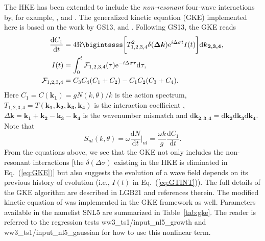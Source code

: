 The HKE has been extended to include the \emph{non-resonant} four-wave
interactions by, for example, \citet{Janssen2003}, \citet{Annenkov2006} and
\citet[][hereafter GS13]{Gramstad2013}. The generalized kinetic equation (GKE)
implemented here is based on the work by GS13, \citet{Gramstad2016} and
\citet[][hereafter LGB21]{Liu2021JFM}. Following GS13, the GKE reads
%
\begin{align}
\frac{\mathrm{d} C_1}{\mathrm{d} t} &= 4 \Re \bigintssss \bigg[ T^2_{1, 2, 3, 4} \delta (\boldsymbol{\Delta k}) \/\mathrm{e}^{i\Delta \sigma t} I(t) \/  \bigg] \mathrm{d} \boldsymbol{k_{2, 3, 4}}, \label{eq:GKE}\\
%
I(t) &= \int_{0}^{t} \mathcal{F}_{1, 2, 3, 4} (\tau) \mathrm{e}^{-i\Delta \sigma \tau } \mathrm{d} \tau, \label{eq:GTINT}\\
%
\mathcal{F}_{1, 2, 3, 4} &= C_3 C_4 (C_1 + C_2) - C_1 C_2 (C_3 + C_4). \label{eq:GPROD}
\end{align}
%
Here $C_1 = C(\boldsymbol{k_1}) = g N(k, \theta) / k$ is the action spectrum,
$T_{1, 2, 3, 4} = T(\boldsymbol{k_1}, \boldsymbol{k_2}, \boldsymbol{k_3}, \boldsymbol{k_4})$
is the interaction coefficient \citep{art:Kra94, art:Jan09},
$\Delta \boldsymbol{k} = \boldsymbol{k_1} + \boldsymbol{k_2} - \boldsymbol{k_3} - \boldsymbol{k_4}$
is the wavenumber mismatch and $\mathrm{d} \boldsymbol{k_{2,3,4}} = \mathrm{d} \boldsymbol{k_2} \mathrm{d} \boldsymbol{k_3} \mathrm{d} \boldsymbol{k_4}$.
Note that
\begin{equation}
S_{nl}(k, \theta) = \omega \frac{\mathrm{d} N}{\mathrm{d}t} \bigg\rvert_{nl} = \frac{\omega k}{g} \frac{\mathrm{d} C_1}{\mathrm{d} t}.
\label{eq:GSnl}
\end{equation}
From the equations above, we see that the GKE not only includes the non-resonant
interactions [the $\delta (\Delta \sigma)$ existing in the HKE is eliminated in
Eq.~(\ref{eq:GKE})] but also suggests the evolution of a wave field depends
on its previous history of evolution (i.e., $I(t)$ in Eq.~(\ref{eq:GTINT})).
The full details of the GKE algorithm are described in LGB21 and
references therein. The modified kinetic equation of \citet{Janssen2003} was
implemented in the GKE framework as well. Parameters available in the
namelist {\F SNL5} are summarized in Table~\ref{tab:gke}. The reader is
referred to the regression tests {\code ww3\_ts1/input\_nl5\_growth} and
{\code ww3\_ts1/input\_nl5\_gaussian} for how to use this nonlinear term.

